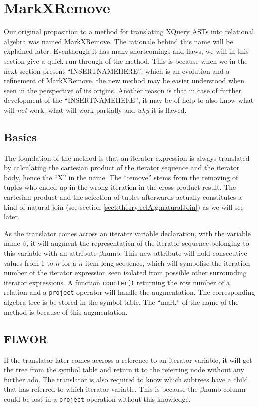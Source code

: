 \section{MarkXRemove}
\label{sect:translation:MarkXRemove}

Our original proposition to a method for translating XQuery ASTs into relational algebra was named MarkXRemove.
The rationale behind this name will be explained later. Eventhough it has many shortcomings and flaws, we
will in this section give a quick run through of the method. This is because when we in the next section present
``INSERTNAMEHERE'', which is an evolution and a refinement of MarkXRemove, the new method may be easier understood
when seen in the perspective of its origins. Another reason is that in case of further development of the
``INSERTNAMEHERE'', it may be of help to also know what will \textit{not} work, what will work partially and
\textit{why} it is flawed.

\subsection{Basics}
\label{sect:translation:mxr:basics}

The foundation of the method is that an iterator expression is always translated by calculating the cartesian
product of the iterator sequence and the iterator body, hence the ``X'' in the name. The ``remove'' stems from the
removing of tuples who ended up in the wrong iteration in the cross product result. The cartesian product and the
selection of tuples afterwards actually constitutes a kind of natural join (see section
\ref{sect:theory:relAlg:naturalJoin}) as we will see later.

As the translator comes across an iterator variable declaration, with the variable name $\beta$, it will augment
the representation of the iterator sequence belonging to this variable with an attribute $\beta$\textsf{numb}.
This new attribute will hold consecutive values from 1 to $n$ for a $n$ item long sequence, which will symbolise the
iteration number of the iterator expression seen isolated from possible other surrounding iterator expressions. A
function \texttt{counter()} returning the row number of a relation and a \texttt{project} operator will handle
the augmentation. The corresponding algebra tree is be stored in the symbol table. The ``mark'' of the name of the
method is because of this augmentation.

\subsection{FLWOR}
\label{sect:translation:mxr:flwor}
If the translator later comes accross a reference to an iterator variable, it will get the tree from the symbol
table and return it to the referring node without any further ado. The translator is also required to know which
subtrees have a child that has referred to which iterator variable. This is because the $\beta$\textsf{numb}
column could be lost in a \texttt{project} operation without this knowledge.

